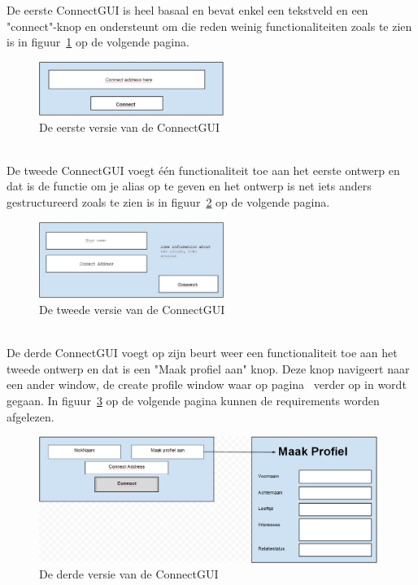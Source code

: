 \documentclass[12pt]{article}
\begin{document}
\noindent De eerste ConnectGUI is heel basaal en bevat enkel een tekstveld en een "connect"-knop en ondersteunt om die reden weinig functionaliteiten zoals te zien is in figuur~\ref{figure004} op de volgende pagina.
\begin{figure}[ht]
\begin{center}
\includegraphics[width = 60mm]{CGDv1}
\caption{De eerste versie van de ConnectGUI}
\label{figure004}
\end{center}
\end{figure}
\\

\noindent De tweede ConnectGUI voegt \'e\'en functionaliteit toe aan het eerste ontwerp en dat is de functie om je alias op te geven en het ontwerp is net iets anders gestructureerd zoals te zien is in figuur~\ref{figure005} op de volgende pagina.
\begin{figure}[ht]
\begin{center}
\includegraphics[width = 60mm]{CGDv2}
\caption{De tweede versie van de ConnectGUI}
\label{figure005}
\end{center}
\end{figure}
\\

\noindent De derde ConnectGUI voegt op zijn beurt weer een functionaliteit toe aan het tweede ontwerp en dat is een "Maak profiel aan" knop. Deze knop navigeert naar een ander window, de create profile window waar op pagina~\pageref{CPW} verder op in wordt gegaan. In figuur~\ref{figure006} op de volgende pagina kunnen de requirements worden afgelezen.
\begin{figure}[ht]
\begin{center}
\includegraphics[width = 110mm]{CGDv3}
\caption{De derde versie van de ConnectGUI}
\label{figure006}
\end{center}
\end{figure}
\end{document}
